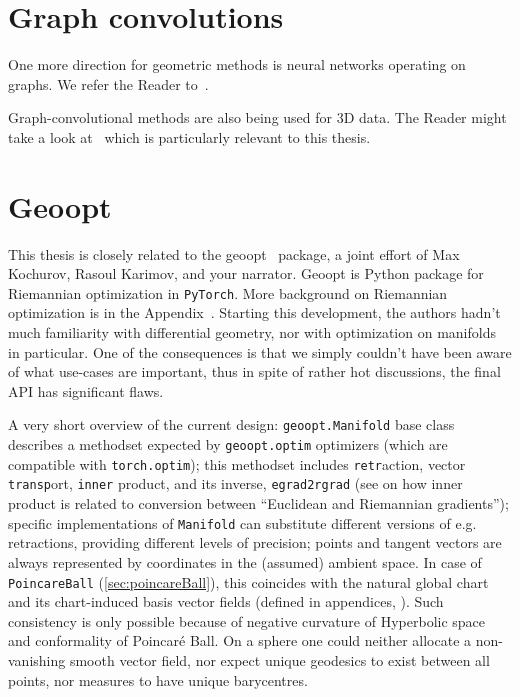 \section{Graph convolutions}

One more direction for geometric methods is neural networks operating on graphs.
We refer the Reader to~\citet{kipf}.

Graph-convolutional methods are also being used for 3D data. The Reader might
take a look at~\citet{edgeconv} which is particularly relevant to this thesis.

\section{Geoopt} \label{sec:geoopt}

This thesis is closely related to the geoopt~\cite{geoopt} package, a joint
effort of Max Kochurov, Rasoul Karimov, and your narrator.
Geoopt is Python package for Riemannian optimization in \texttt{PyTorch}.
More background on Riemannian optimization is in the Appendix~.
Starting this development, the authors hadn't much familiarity with
differential geometry, nor with optimization on manifolds in particular. One of
the consequences is that we simply couldn't have been aware of what use-cases
are important, thus in spite of rather hot discussions, the final API has
significant flaws.

A very short overview of the current design: \texttt{geoopt.Manifold} base
class describes a methodset expected by \texttt{geoopt.optim} optimizers (which
are compatible with \texttt{torch.optim}); this methodset includes
\texttt{retr}action, vector \texttt{transp}ort, \texttt{inner} product, and its
inverse, \texttt{egrad2rgrad} (see  on how inner
product is related to conversion between ``Euclidean and Riemannian
gradients''); specific implementations of \texttt{Manifold}
can substitute different versions of e.g. retractions, providing different
levels of precision; points and tangent vectors are always represented by
coordinates in the (assumed) ambient space. In case of \texttt{PoincareBall}
(\autoref{sec:poincareBall}),
this coincides with the natural global chart and its chart-induced basis vector
fields (defined in appendices, ). Such
consistency is only possible because of negative curvature of
Hyperbolic space and conformality of Poincar\'e Ball.
On a sphere one could neither allocate a non-vanishing smooth
vector field, nor expect unique geodesics to exist between all points, nor measures to
have unique barycentres.

